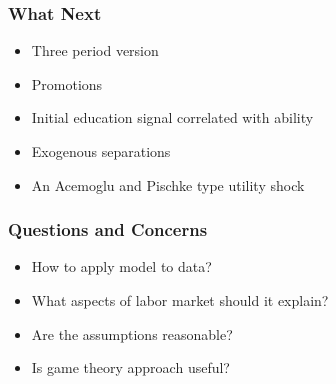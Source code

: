 \documentclass{beamer}
\begin{document}
\begin{frame}
\frametitle{What Next}
\begin{itemize}
	\setlength{\itemsep}{5mm}
	\item Three period version 
	\item Promotions
	\item Initial education signal correlated with ability 
	\item Exogenous separations 
	\item An Acemoglu and Pischke type utility shock 
\end{itemize}
\end{frame}

\begin{frame}
\frametitle{Questions and Concerns }
\begin{itemize}
	\setlength{\itemsep}{5mm}
	\item How to apply model to data?
	\item What aspects of labor market should it explain? 
	\item Are the assumptions reasonable? 
	\item Is game theory approach useful? 
	
\end{itemize}
\end{frame}


\end{document}
